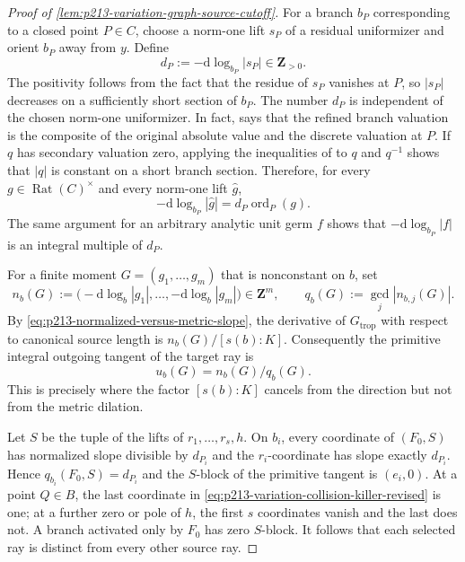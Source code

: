 \begin{proof}[Proof of
\cref{lem:p213-variation-graph-source-cutoff}]
For a branch $b_P$ corresponding to a closed point $P\in C$, choose a
norm-one lift $s_P$ of a residual uniformizer and orient $b_P$ away from
$y$.  Define
\begin{equation}
             d_P:=-\mathrm d\log_{b_P}|s_P|\in\mathbf Z_{>0}.
\label{eq:p213-variation-integral-branch-weight}
\end{equation}
The positivity follows from the fact that the residue of $s_P$ vanishes
at $P$, so $|s_P|$ decreases on a sufficiently short section of $b_P$.
The number $d_P$ is independent of the chosen norm-one uniformizer.  In
fact, \cite[\S4.2.11.1]{Ducros24CurveStructure} says that the refined
branch valuation is the composite of the original absolute value and the
discrete valuation at $P$.  If $q$ has secondary valuation zero, applying
the inequalities of \cite[\S4.2.6]{Ducros24CurveStructure} to $q$ and
$q^{-1}$ shows that $|q|$ is constant on a short branch section.  Therefore,
for every $g\in\operatorname{Rat}(C)^\times$ and every norm-one lift
$\widehat g$,
\begin{equation}
       -\mathrm d\log_{b_P}|\widehat g|
                 =d_P\operatorname{ord}_P(g).
\label{eq:p213-variation-residual-normalized-slope}
\end{equation}
The same argument for an arbitrary analytic unit germ $f$ shows that
$-\mathrm d\log_{b_P}|f|$ is an integral multiple of $d_P$.

For a finite moment $G=(g_1,\ldots,g_m)$ that is nonconstant on $b$, set
\begin{equation}
 n_b(G):=\bigl(-\mathrm d\log_b|g_1|,\ldots,
                    -\mathrm d\log_b|g_m|\bigr)\in\mathbf Z^m,
 \qquad q_b(G):=\gcd_j|n_{b,j}(G)|.
\label{eq:p213-integral-slope-vector}
\end{equation}
By \eqref{eq:p213-normalized-versus-metric-slope}, the derivative of
$G_{\mathrm{trop}}$ with respect to canonical source length is
$n_b(G)/[s(b):K]$.  Consequently the primitive integral outgoing tangent
of the target ray is
\begin{equation}
                              u_b(G)=n_b(G)/q_b(G).
\label{eq:p213-primitive-integral-tangent}
\end{equation}
This is precisely where the factor $[s(b):K]$ cancels from the direction
but not from the metric dilation.

Let $S$ be the tuple of the lifts of $r_1,\ldots,r_s,h$.  On $b_i$, every
coordinate of $(F_0,S)$ has normalized slope divisible by $d_{P_i}$ and
the $r_i$-coordinate has slope exactly $d_{P_i}$.  Hence
$q_{b_i}(F_0,S)=d_{P_i}$ and the $S$-block of the primitive tangent is
$(e_i,0)$.  At a point $Q\in B$, the last coordinate in
\eqref{eq:p213-variation-collision-killer-revised} is one; at a further
zero or pole of $h$, the first $s$ coordinates vanish and the last does
not.  A branch activated only by $F_0$ has zero $S$-block.  It follows
that each selected ray is distinct from every other source ray.


\end{proof}
